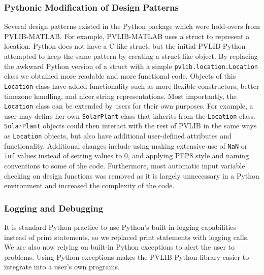 \documentclass[conference]{IEEEtran}
\begin{document}
\subsubsection{Pythonic Modification of Design Patterns}
Several design patterns existed in the Python package which were hold-overs from PVLIB-MATLAB. 
For example, PVLIB-MATLAB uses a struct to represent a location. 
Python does not have a C-like struct, but the initial PVLIB-Python attempted to keep the same pattern by creating a struct-like object.
By replacing the awkward Python version of a struct with a simple \texttt{pvlib.location.Location} class we obtained more readable and more functional code.
Objects of this \texttt{Location} class have added functionality such as more flexible constructors, better timezone handling, and nicer string representations.
Most importantly, the \texttt{Location} class can be extended by users for their own purposes.
For example, a user may define her own \texttt{SolarPlant} class that inherits from the \texttt{Location} class. 
\texttt{SolarPlant} objects could then interact with the rest of PVLIB in the same ways as \texttt{Location} objects, but also have additional user-defined attributes and functionality.
Additional changes include using making extensive use of \texttt{NaN} or \texttt{inf} values instead of setting values to 0, and applying PEP8 style and naming conventions \cite{pep8} to some of the code. 
Furthermore, most automatic input variable checking on design functions was removed as it is largely unnecessary in a Python environment and increased the complexity of the code. 

\subsubsection{Logging and Debugging}
It is standard Python practice to use Python's built-in logging capabilities instead of print statements, so we replaced print statements with logging calls.
We are also now relying on built-in Python exceptions to alert the user to problems.
Using Python exceptions makes the PVLIB-Python library easier to integrate into a user's own programs.
\end{document}
